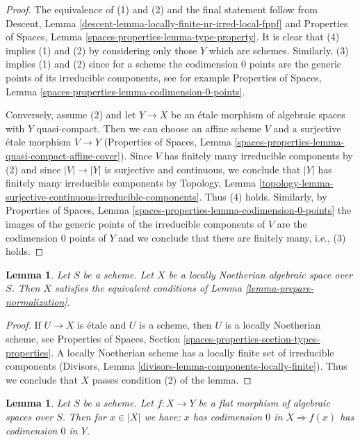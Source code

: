 \documentclass{stacks-project}
\theoremstyle{plain}
\newtheorem{lemma}[subsection]{Lemma}
\theoremstyle{definition}
\theoremstyle{remark}
\numberwithin{equation}{subsection}
\begin{document}
\begin{proof}
The equivalence of (1) and (2) and the final statement follow from
Descent, Lemma \ref{descent-lemma-locally-finite-nr-irred-local-fppf} and
Properties of Spaces, Lemma \ref{spaces-properties-lemma-type-property}.
It is clear that (4) implies (1) and (2) by considering only those $Y$
which are schemes. Similarly, (3) implies (1) and (2) since for a scheme
the codimension $0$ points are the generic points of its
irreducible components, see for example
Properties of Spaces, Lemma \ref{spaces-properties-lemma-codimension-0-points}.

\medskip\noindent
Conversely, assume (2) and let $Y \to X$ be an \'etale morphism of
algebraic spaces with $Y$ quasi-compact. Then we can choose an affine
scheme $V$ and a surjective \'etale morphism $V \to Y$
(Properties of Spaces, Lemma
\ref{spaces-properties-lemma-quasi-compact-affine-cover}).
Since $V$ has finitely many irreducible components by (2) and since
$|V| \to |Y|$ is surjective and continuous, we conclude that
$|Y|$ has finitely many irreducible components by Topology, Lemma
\ref{topology-lemma-surjective-continuous-irreducible-components}.
Thus (4) holds. Similarly, by
Properties of Spaces, Lemma \ref{spaces-properties-lemma-codimension-0-points}
the images of the generic points of the irreducible components of $V$
are the codimension $0$ points of $Y$ and we conclude that there are
finitely many, i.e., (3) holds.
\end{proof}

\begin{lemma}
\label{lemma-locally-noetherian-can-be-normalized}
Let $S$ be a scheme. Let $X$ be a locally Noetherian algebraic space
over $S$. Then $X$ satisfies the equivalent conditions of
Lemma \ref{lemma-prepare-normalization}.
\end{lemma}

\begin{proof}
If $U \to X$ is \'etale and $U$ is a scheme, then $U$ is a locally Noetherian
scheme, see Properties of Spaces, Section
\ref{spaces-properties-section-types-properties}.
A locally Noetherian scheme has a locally finite set of irreducible
components (Divisors, Lemma \ref{divisors-lemma-components-locally-finite}).
Thus we conclude that $X$ passes condition (2) of the lemma.
\end{proof}

\begin{lemma}
\label{lemma-flat-image-point-codimension-0}
Let $S$ be a scheme. Let $f : X \to Y$ be a flat morphism of algebraic
spaces over $S$. Then for $x \in |X|$ we have: $x$ has codimension $0$ in
$X \Rightarrow f(x)$ has codimension $0$ in $Y$.
\end{lemma}
\end{document}
